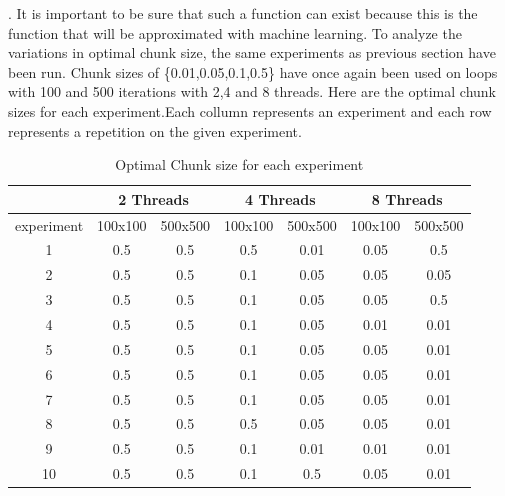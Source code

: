 \documentclass[12pt]{article}
\begin{document}
 . It is important to be sure that such a function can exist because this is the function that will be approximated with machine learning. To analyze the variations in optimal chunk size, the same experiments as previous section have been run. Chunk sizes of \{0.01,0.05,0.1,0.5\} have once again been used on loops with 100 and 500 iterations with 2,4 and 8 threads. Here are the optimal chunk sizes for each experiment.Each collumn represents an experiment and each row represents a repetition on the given experiment.
\begin{table}[H]
	\centering
	\caption{Optimal Chunk size for each experiment}
	\label{my-label}
	\begin{tabular}{|c|c|c|c|c|c|c|}
		\hline
		&
		\multicolumn{2}{|c|}{2 Threads} & \multicolumn{2}{c|}{4 Threads} & \multicolumn{2}{c|}{8 Threads} \\ \hline
		experiment&100x100       & 500x500       & 100x100       & 500x500      & 100x100       & 500x500      \\ \hline
		1&0.5            & 0.5            & 0.5            & 0.01          & 0.05           & 0.5           \\ \hline
		2&0.5            & 0.5            & 0.1            & 0.05          & 0.05           & 0.05          \\ \hline
		3&0.5            & 0.5            & 0.1            & 0.05          & 0.05           & 0.5           \\ \hline
		4&0.5            & 0.5            & 0.1            & 0.05          & 0.01           & 0.01          \\ \hline
		5&0.5            & 0.5            & 0.1            & 0.05          & 0.05           & 0.01          \\ \hline
		6&0.5            & 0.5            & 0.1            & 0.05          & 0.05           & 0.01          \\ \hline
		7&0.5            & 0.5            & 0.1            & 0.05          & 0.05           & 0.01          \\ \hline
		8&0.5            & 0.5            & 0.5            & 0.05          & 0.05           & 0.01          \\ \hline
		9&0.5            & 0.5            & 0.1            & 0.01          & 0.01           & 0.01          \\ \hline
		10&0.5            & 0.5            & 0.1            & 0.5           & 0.05           & 0.01          \\ \hline
	\end{tabular}
\end{table}
\end{document}
